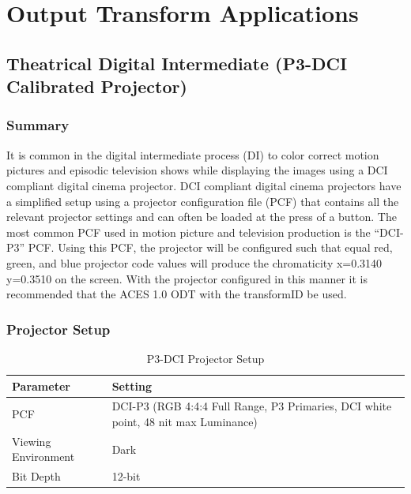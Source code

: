 \numberedformat

\clearpage
\chapter{Output Transform Applications}\label{ch:ot-app}


\section{Theatrical Digital Intermediate (P3-DCI Calibrated Projector)}
\label{sec:ot-app-p3dci}

\subsection{Summary}
\label{subsec:summary-p3dci}

It is common in the digital intermediate process (DI) to color correct
motion pictures and episodic television shows while displaying the
images using a DCI compliant digital cinema projector. DCI compliant
digital cinema projectors have a simplified setup using a projector
configuration file (PCF) that contains all the relevant projector
settings and can often be loaded at the press of a button. The most
common PCF used in motion picture and television production is the
``DCI-P3'' PCF. Using this PCF, the projector will be configured such
that equal red, green, and blue projector code values will produce the
chromaticity x=0.3140 y=0.3510 on the screen. With the projector
configured in this manner it is recommended that the ACES 1.0 ODT with
the transformID \texttt{} be used.

\subsection{Projector Setup}
\label{subsec:setup-p3dci}

\begin{table}[ht!]
    \centering
        \begin{tabular}{|p{1.25in}|p{3in}|}
            \hline
            \textbf{Parameter} & \textbf{Setting} \\ \hline
            PCF & DCI-P3 (RGB 4:4:4 Full Range, P3 Primaries, DCI white point, 48 nit max Luminance) \\ \hline
            Viewing Environment & Dark \\ \hline
            Bit Depth & 12-bit \\ \hline 
    \end{tabular}
    \caption[ P3-DCI Projector Setup ]{\small P3-DCI Projector Setup} 
    \label{tab:setup-p3dci}
\end{table}

